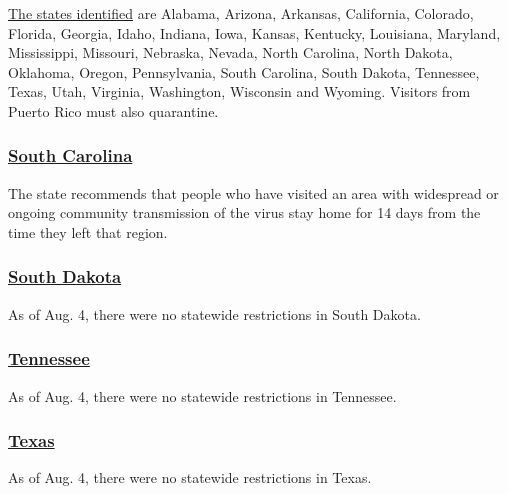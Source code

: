 \href{https://docs.google.com/spreadsheets/d/e/2PACX-1vSUCk9FlHBoJt5ZO0U6PKTTY7jHH8V4MovED0WiqpTTixdgMSCnUWI25xX5DCmQmtLknzu7Bo0jwY02/pubhtml?gid=0\&single=true}{The
states identified} are Alabama, Arizona, Arkansas, California, Colorado,
Florida, Georgia, Idaho, Indiana, Iowa, Kansas, Kentucky, Louisiana,
Maryland, Mississippi, Missouri, Nebraska, Nevada, North Carolina, North
Dakota, Oklahoma, Oregon, Pennsylvania, South Carolina, South Dakota,
Tennessee, Texas, Utah, Virginia, Washington, Wisconsin and Wyoming.
Visitors from Puerto Rico must also quarantine.

\hypertarget{south-carolina}{%
\subsubsection{\texorpdfstring{\href{https://scdhec.gov/infectious-diseases/viruses/coronavirus-disease-2019-covid-19/travelers-covid-19}{South
Carolina}}{South Carolina}}\label{south-carolina}}

The state recommends that people who have visited an area with
widespread or ongoing community transmission of the virus stay home for
14 days from the time they left that region.

\hypertarget{south-dakota}{%
\subsubsection{\texorpdfstring{\href{https://www.travelsouthdakota.com/coronavirus-covid-19}{South
Dakota}}{South Dakota}}\label{south-dakota}}

As of Aug. 4, there were no statewide restrictions in South Dakota.

\hypertarget{tennessee}{%
\subsubsection{\texorpdfstring{\href{https://www.tnvacation.com/articles/tennessee-travel-amid-coronavirus}{Tennessee}}{Tennessee}}\label{tennessee}}

As of Aug. 4, there were no statewide restrictions in Tennessee.

\hypertarget{texas}{%
\subsubsection{\texorpdfstring{\href{https://gov.texas.gov/travel-texas/page/covid19}{Texas}}{Texas}}\label{texas}}

As of Aug. 4, there were no statewide restrictions in Texas.

